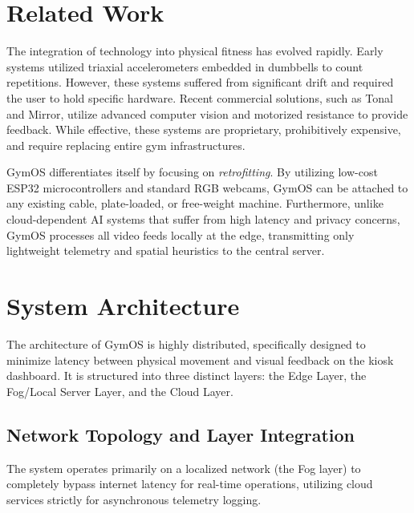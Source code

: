 \documentclass[conference]{IEEEtran}
\begin{document}
\section{Related Work}
The integration of technology into physical fitness has evolved rapidly. Early systems utilized triaxial accelerometers embedded in dumbbells to count repetitions. However, these systems suffered from significant drift and required the user to hold specific hardware. 
Recent commercial solutions, such as Tonal and Mirror, utilize advanced computer vision and motorized resistance to provide feedback. While effective, these systems are proprietary, prohibitively expensive, and require replacing entire gym infrastructures. 

GymOS differentiates itself by focusing on \textit{retrofitting}. By utilizing low-cost ESP32 microcontrollers and standard RGB webcams, GymOS can be attached to any existing cable, plate-loaded, or free-weight machine. Furthermore, unlike cloud-dependent AI systems that suffer from high latency and privacy concerns, GymOS processes all video feeds locally at the edge, transmitting only lightweight telemetry and spatial heuristics to the central server.

\section{System Architecture}
The architecture of GymOS is highly distributed, specifically designed to minimize latency between physical movement and visual feedback on the kiosk dashboard. It is structured into three distinct layers: the Edge Layer, the Fog/Local Server Layer, and the Cloud Layer.

\subsection{Network Topology and Layer Integration}
The system operates primarily on a localized network (the Fog layer) to completely bypass internet latency for real-time operations, utilizing cloud services strictly for asynchronous telemetry logging.
\end{document}
